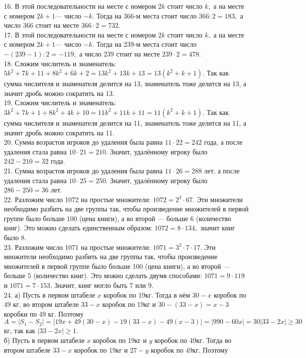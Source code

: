 16. В этой последовательности на месте с номером $2k$ стоит число $k,$ а на месте с номером $2k+1$--- число $-k.$ Тогда на 366-м места стоит число $366:2=183,$ а число 366 стоит на месте $366\cdot2=732.$\\
17. В этой последовательности на месте с номером $2k$ стоит число $k,$ а на месте с номером $2k+1$--- число $-k.$ Тогда на 239-м места стоит число $-(239-1):2=-119,$ а число 239 стоит на месте $239\cdot2=478.$\\
18. Сложим числитель и знаменатель: $5k^2+7k+11+8k^2+6k+2=13k^2+13k+13=13(k^2+k+1).$ Так как сумма числителя и знаменателя делится на 13, знаменатель тоже делится на 13, а значит дробь можно сократить на 13.\\
19. Сложим числитель и знаменатель: $3k^2+7k+1+8k^2+4k+10=11k^2+11k+11=11(k^2+k+1).$ Так как сумма числителя и знаменателя делится на 11, знаменатель тоже делится на 11, а значит дробь можно сократить на 11.\\
20. Сумма возрастов игроков до удаления была равна $11\cdot22=242$ года, а после удаления стала равна $10\cdot21=210.$ Значит, удалённому игроку было $242-210=32$ года.\\
21. Сумма возрастов игроков до удаления была равна $11\cdot26=288$ лет, а после удаления стала равна $10\cdot25=250.$ Значит, удалённому игроку было $286-250=36$ лет.\\
22. Разложим число 1072 на простые множители: $1072=2^4\cdot67.$ Эти множители необходимо разбить на две группы так, чтобы произведение множителей в первой группе было больше 100 (цена книги), а во второй --- больше 6 (количество книг). Это можно сделать единственным образом: $1072=8\cdot134,$ значит книг было 8.\\
23. Разложим число 1071 на простые множители: $1071=3^2\cdot7\cdot17.$ Эти множители необходимо разбить на две группы так, чтобы произведение множителей в первой группе было больше 100 (цена книги), а во второй --- больше 5 (количество книг). Это можно сделать двумя способами: $1071=9\cdot119$ и $1071=7\cdot153.$ Значит, книг могло быть 7 или 9.\\
24. а) Пусть в первом штабеле $x$ коробок по 19кг. Тогда в нём $30-x$ коробок по 49 кг, во втором штабеле $33-x$ коробок по 19кг и $30-(33-x)=x-3$ коробки по 49 кг.
Поэтому $A=|S_1-S_2|=|19x+49(30-x)-19(33-x)-49(x-3)|=|990-60x|=30|33-2x|\geqslant30$кг, так как $|33-2x|\geqslant1.$\\
б) Пусть в первом штабеле $x$ коробок по 19кг и $y$ коробок по 49кг. Тогда во втором штабеле $33-x$ коробок по 19кг и $27-y$ коробок по 49кг. Поэтому
